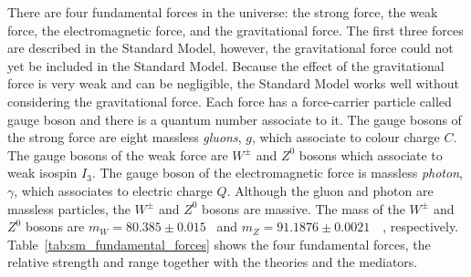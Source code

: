 
There are four fundamental forces in the universe: the strong force, the weak force, the electromagnetic force, and the gravitational force.
The first three forces are described in the Standard Model, however, the gravitational force could not yet be included in the Standard Model.
Because the effect of the gravitational force is very weak and can be negligible, the Standard Model works well without considering the gravitational force.
Each force has a force-carrier particle called gauge boson and there is a quantum number associate to it.
The gauge bosons of the strong force are eight massless \textit{gluons}, $g$, which associate to colour charge $C$.
The gauge bosons of the weak force are $W^{\pm}$ and $Z^{0}$ bosons which associate to weak isospin $I_{3}$.
The gauge boson of the electromagnetic force is massless \textit{photon}, $\gamma$, which associates to electric charge $Q$.
Although the gluon and photon are massless particles, the $W^{\pm}$ and $Z^{0}$ bosons are massive.
The mass of the $W^{\pm}$ and $Z^{0}$ bosons are $m_{W}=80.385 \pm 0.015$~{\GeV} and $m_{Z}=91.1876 \pm 0.0021$~{\GeV}~\cite{PDG}, respectively.
Table~\ref{tab:sm_fundamental_forces} shows the four fundamental forces, the relative strength and range together with the theories and the mediators.

\begin{table}[htp]
\caption{The four fundamental forces with the relative strength, interaction range, describing theory, and the mediator with its mass.
The gravitational force is not a part of the Standard Model and the graviton is a theoretical particle.}
\label{tab:sm_fundamental_forces}
\end{table}%

